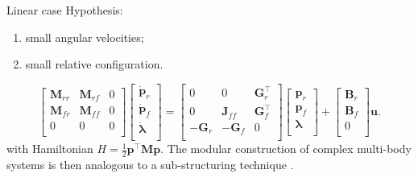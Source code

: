 \documentclass[aspectratio=169]{ISAE-Beamer}
\begin{document}
\begin{frame}{Linear case}
	Hypothesis:
	\begin{enumerate}
		\item small angular velocities;
		\item small relative configuration.
	\end{enumerate} 
	
	\begin{equation*}
	\label{eq:mbd_linear}
	\begin{bmatrix}
	\mathbf{M}_{rr} & \mathbf{M}_{rf} & 0 \\ 
	\mathbf{M}_{fr} & \mathbf{M}_{ff} & 0 \\
	0 & 0 & 0 \\
	\end{bmatrix}
	\begin{bmatrix}
	\dot{\mathbf{p}}_r \\ \dot{\mathbf{p}}_f \\ \dot{\bm{\lambda}} \\ 
	\end{bmatrix} = 
	\begin{bmatrix}
	0 & 0 & \mathbf{G}_r^\top \\ 
	0 & \mathbf{J}_{ff} & \mathbf{G}_f^\top \\ 
	-\mathbf{G}_r & -\mathbf{G}_f & 0 \\
	\end{bmatrix}
	\begin{bmatrix}
	\mathbf{p}_r \\ \mathbf{p}_f \\ {\bm{\lambda}} \\ 
	\end{bmatrix} + 
	\begin{bmatrix}
	\mathbf{B}_r \\ \mathbf{B}_f \\ 0 \\
	\end{bmatrix}\mathbf{u}.
	\end{equation*}
	with Hamiltonian $H = \frac{1}{2} \mathbf{p}^\top\mathbf{M}\mathbf{p}$. The modular construction of complex multi-body systems is then analogous to a sub-structuring technique .  
\end{frame}
\end{document}
